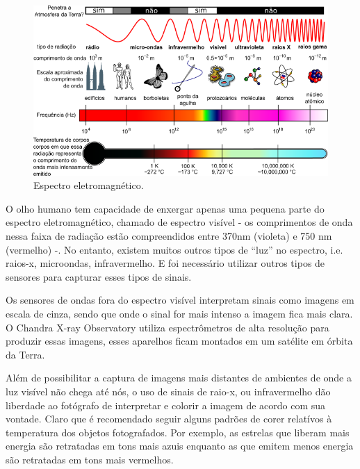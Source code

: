 \documentclass[
	article,			%
	12pt,				%
	oneside,			%
	a4paper,			%
	english,			%
	brazil,				%
	sumario=tradicional
	]{abntex2}
\begin{document}
\begin{figure}[h]
	\includegraphics[width=\linewidth]{img/espectro.png}
	\caption{Espectro eletromagnético.}
	\label{fig:esel}
	\centering
\end{figure}

O olho humano tem capacidade de enxergar apenas uma pequena parte do espectro
eletromagnético, chamado de espectro visível - os comprimentos de onda nessa
faixa de radiação estão compreendidos entre 370nm (violeta) e 750 nm (vermelho)
-. No entanto, existem muitos outros tipos de ``luz'' no espectro, i.e. raios-x,
microondas, infravermelho. E foi necessário utilizar outros tipos de sensores
para capturar esses tipos de sinais.

Os sensores de ondas fora do espectro visível interpretam sinais como imagens em
escala de cinza, sendo que onde o sinal for mais intenso a imagem fica mais
clara. O Chandra X-ray Observatory utiliza espectrômetros de alta resolução para
produzir essas imagens, esses aparelhos ficam montados em um satélite em órbita
da Terra. \cite{scienceinstruments}

Além de possibilitar a captura de imagens mais distantes de ambientes de onde a
luz visível não chega até nós, o uso de sinais de raio-x, ou infravermelho dão
liberdade ao fotógrafo de interpretar e colorir a imagem de acordo com sua
vontade. Claro que é recomendado seguir alguns padrões de corer relatívos à
temperatura dos objetos fotografados. Por exemplo, as estrelas que liberam mais
energia são retratadas em tons mais azuis enquanto as que emitem menos energia
são retratadas em tons mais vermelhos. \cite{temperatura}
\end{document}
